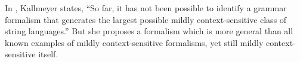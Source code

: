 \documentclass{article}
\theoremstyle{remark} \newtheorem{technicality}{Technical note}
\theoremstyle{definition} \newtheorem{definition}{Definition}
\begin{document}
In \cite{kallmeyer}, Kallmeyer states, ``So far, it has not been possible to identify a grammar formalism that generates the largest possible mildly context-sensitive class of string languages.''
But she proposes a formalism which is more general than all known examples of mildly context-sensitive formalisms, yet still mildly context-sensitive itself.
\end{document}

